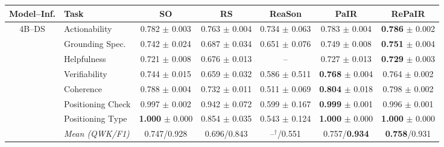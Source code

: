 \begin{table}[!t]
\centering
\captionsetup{font=compacttable,skip=3pt}

{\fontsize{9pt}{9.8pt}\selectfont
\setlength{\tabcolsep}{0.8pt}
\renewcommand{\arraystretch}{0.85}
\begin{tabular*}{\textwidth}{@{\extracolsep{\fill}}clccccc@{}}
\toprule
Model--Inf. & Task & SO & RS & ReaSon & PaIR & RePaIR \\
\midrule

\multirow{8}{*}{4B--DS}
& Actionability & 0.782 $\pm$ 0.003 & 0.763 $\pm$ 0.004 & 0.734 $\pm$ 0.063 & 0.783 $\pm$ 0.004 & \textbf{0.786} $\pm$ 0.002 \\
& Grounding Spec. & 0.742 $\pm$ 0.024 & 0.687 $\pm$ 0.034 & 0.651 $\pm$ 0.076 & 0.749 $\pm$ 0.008 & \textbf{0.751} $\pm$ 0.004 \\
& Helpfulness & 0.721 $\pm$ 0.008 & 0.676 $\pm$ 0.013 & -- & 0.727 $\pm$ 0.013 & \textbf{0.729} $\pm$ 0.003 \\
& Verifiability & 0.744 $\pm$ 0.015 & 0.659 $\pm$ 0.032 & 0.586 $\pm$ 0.511 & \textbf{0.768} $\pm$ 0.004 & 0.764 $\pm$ 0.002 \\
\cmidrule(lr){2-7}
& Coherence & 0.788 $\pm$ 0.004 & 0.732 $\pm$ 0.011 & 0.511 $\pm$ 0.069 & \textbf{0.804} $\pm$ 0.018 & 0.798 $\pm$ 0.002 \\
& Positioning Check & 0.997 $\pm$ 0.002 & 0.942 $\pm$ 0.072 & 0.599 $\pm$ 0.167 & \textbf{0.999} $\pm$ 0.001 & 0.996 $\pm$ 0.001 \\
& Positioning Type & \textbf{1.000} $\pm$ 0.000 & 0.854 $\pm$ 0.035 & 0.543 $\pm$ 0.124 & \textbf{1.000} $\pm$ 0.000 & \textbf{1.000} $\pm$ 0.000 \\
& \textit{Mean (QWK/F1)} & 0.747/0.928 & 0.696/0.843 & --$^{\dagger}$/0.551 & 0.757/\textbf{0.934} & \textbf{0.758}/0.931 \\
\midrule


\end{tabular*}}
\end{table}
